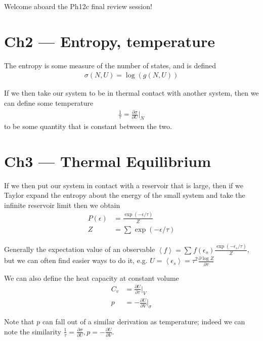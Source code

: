 \documentclass[10pt,twocolumn]{article}
\newcommand{\pd}[2]{\frac{\partial#1}{\partial#2}}
\newcommand{\expvalue}[1]{\left<#1\right>}
\begin{document}
\pagestyle{fancy}
\cfoot{\thepage/\pageref{LastPage}}

Welcome aboard the Ph12c final review session!
\tableofcontents
\newpage

\section{Ch2 --- Entropy, temperature}

The entropy is some measure of the number of states, and is defined
\begin{align}
    \sigma(N,U) = \log(g(N,U))\label{S1}
\end{align}

If we then take our system to be in thermal contact with another system, then we can define some temperature 
\begin{align}
    \frac{1}{\tau} = \pd{\sigma}{U}\Bigg|_N\label{T1}
\end{align}
to be some quantity that is constant between the two.

\section{Ch3 --- Thermal Equilibrium}

If we then put our system in contact with a reservoir that is large, then if we Taylor expand the entropy about the energy of the small system and take the infinite reservoir limit then we obtain
\begin{align}
    P(\epsilon) &= \frac{\exp(-\epsilon/\tau)}{Z}\label{BoltzP}\\
    Z &= \sum\limits_{}^{}\exp(-\epsilon/\tau)\label{Z1}
\end{align}

Generally the expectation value of an observable $\expvalue{f} = \sum\limits_{}^{}f(\epsilon_s) \frac{\exp(-\epsilon_s/\tau)}{Z}$, but we can often find easier ways to do it, e.g. $U = \expvalue{\epsilon_s} = \tau^2 \pd{\log Z}{\tau}$

We can also define the heat capacity at constant volume
\begin{align}
    C_v &= \pd{U}{\tau}\Bigg|_V\label{CV}\\
    p &= -\pd{U}{V}\Bigg|_\sigma\label{p}
\end{align}

Note that $p$ can fall out of a similar derivation as temperature; indeed we can note the similarity $\frac{1}{\tau} = \pd{\sigma}{U}, p = -\pd{U}{V}$.
\end{document}

